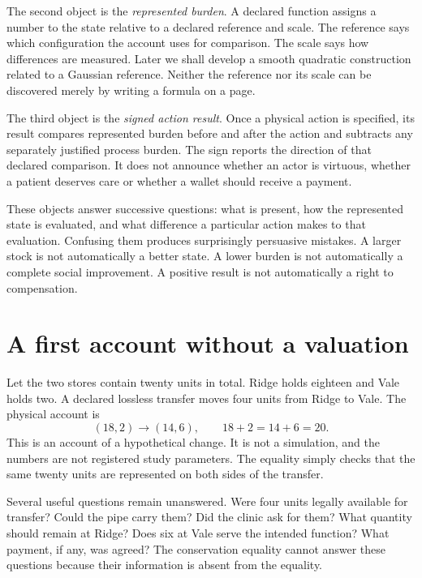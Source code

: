 The second object is the \emph{represented burden}. A declared function assigns a number to the state relative to a declared reference and scale. The reference says which configuration the account uses for comparison. The scale says how differences are measured. Later we shall develop a smooth quadratic construction related to a Gaussian reference. Neither the reference nor its scale can be discovered merely by writing a formula on a page.

The third object is the \emph{signed action result}. Once a physical action is specified, its result compares represented burden before and after the action and subtracts any separately justified process burden. The sign reports the direction of that declared comparison. It does not announce whether an actor is virtuous, whether a patient deserves care or whether a wallet should receive a payment.

These objects answer successive questions: what is present, how the represented state is evaluated, and what difference a particular action makes to that evaluation. Confusing them produces surprisingly persuasive mistakes. A larger stock is not automatically a better state. A lower burden is not automatically a complete social improvement. A positive result is not automatically a right to compensation.

\section{A first account without a valuation}
Let the two stores contain twenty units in total. Ridge holds eighteen and Vale holds two. A declared lossless transfer moves four units from Ridge to Vale. The physical account is
\begin{equation}
 (18,2)\longrightarrow(14,6),\qquad 18+2=14+6=20.
\end{equation}
This is an account of a hypothetical change. It is not a simulation, and the numbers are not registered study parameters. The equality simply checks that the same twenty units are represented on both sides of the transfer.

Several useful questions remain unanswered. Were four units legally available for transfer? Could the pipe carry them? Did the clinic ask for them? What quantity should remain at Ridge? Does six at Vale serve the intended function? What payment, if any, was agreed? The conservation equality cannot answer these questions because their information is absent from the equality.


